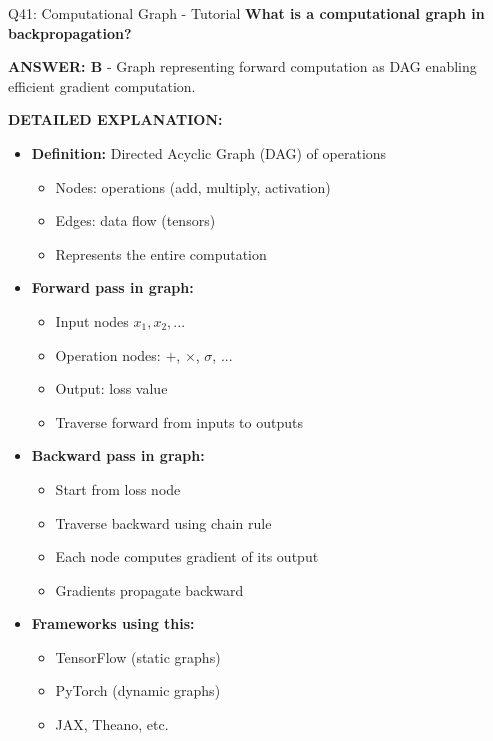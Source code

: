 \documentclass[8pt]{beamer}
\begin{document}
	\begin{frame}{Q41: Computational Graph - Tutorial}
		\fontsize{6.5}{7.5}\selectfont
		\textbf{What is a computational graph in backpropagation?}
		
		\vspace{0.05cm}
		\textcolor{myblue}{\textbf{ANSWER: B}} - Graph representing forward computation as DAG enabling efficient gradient computation.
		
		\vspace{0.05cm}
		\textbf{DETAILED EXPLANATION:}
		\begin{itemize}
			\item \textbf{Definition:} Directed Acyclic Graph (DAG) of operations
			\begin{itemize}
				\item Nodes: operations (add, multiply, activation)
				\item Edges: data flow (tensors)
				\item Represents the entire computation
			\end{itemize}
			\item \textbf{Forward pass in graph:}
			\begin{itemize}
				\item Input nodes $x_1, x_2, ...$
				\item Operation nodes: $+$, $\times$, $\sigma$, ...
				\item Output: loss value
				\item Traverse forward from inputs to outputs
			\end{itemize}
			\item \textbf{Backward pass in graph:}
			\begin{itemize}
				\item Start from loss node
				\item Traverse backward using chain rule
				\item Each node computes gradient of its output
				\item Gradients propagate backward
			\end{itemize}
			\item \textbf{Frameworks using this:}
			\begin{itemize}
				\item TensorFlow (static graphs)
				\item PyTorch (dynamic graphs)
				\item JAX, Theano, etc.
			\end{itemize}
		\end{itemize}
		

\end{frame}
\end{document}
